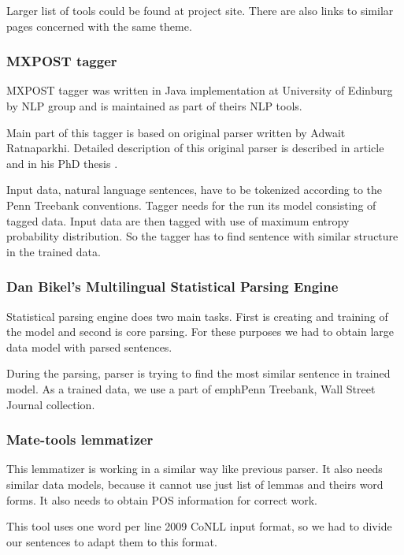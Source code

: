 Larger list of tools could be found at project site. There are also links to similar pages concerned with the same theme. 
          
\subsubsection{MXPOST tagger} 
MXPOST tagger was written in Java implementation at University of Edinburg by NLP group and is maintained as part of theirs NLP tools.
        
Main part of this tagger is based on original parser written by Adwait Ratnaparkhi. Detailed description of this original parser is described in article \cite{Linguistics-ratnaparkhi96} and in his PhD thesis \cite{Linguistics-ratnaparkhi98}. 

Input data, natural language sentences, have to be tokenized according to the Penn Treebank conventions. Tagger needs for the run its model consisting of tagged data. Input data are then tagged with use of maximum entropy probability distribution. So the tagger has to find sentence with similar structure in the trained data.
  
\subsubsection{Dan Bikel's Multilingual Statistical Parsing Engine}   

Statistical parsing engine does two main tasks. First is creating and training of the model and second is core parsing. For these purposes we had to obtain large data model with parsed sentences. 

During the parsing, parser is trying to find the most similar sentence in trained model. As a trained data, we use a part of emph{Penn Treebank, Wall Street Journal collection}.

\subsubsection{Mate-tools lemmatizer}          
          
This lemmatizer is working in a similar way like previous parser. It also needs similar data models, because it cannot use just list of lemmas and theirs word forms. It also needs to obtain POS information for correct work.

This tool uses one word per line 2009 CoNLL input format, so we had to divide our sentences to adapt them to this format.

